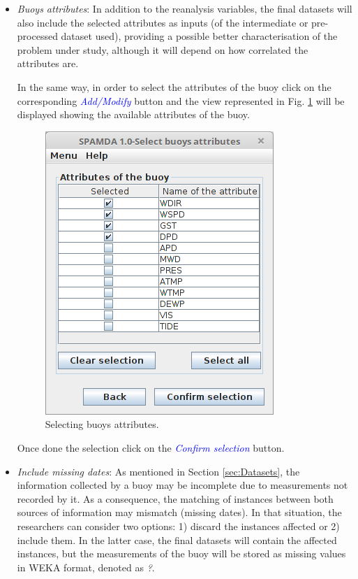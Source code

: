 \begin{onehalfspace}
\begin{itemize}
					\item \textit{Buoys attributes}: In addition to the reanalysis variables, the final datasets will also include the selected attributes as inputs (of the intermediate or pre-processed dataset used), providing a possible better characterisation of the problem under study, although it will depend on how correlated the attributes are.
					
					In the same way, in order to select the attributes of the buoy click on the corresponding \textcolor{blue}{\textit{Add/Modify}} button and the view represented in Fig. \ref{fig:selectingBuoysAttributes} will be displayed showing the available attributes of the buoy.
					
					\begin{figure}[ht!]
						\centering
						\includegraphics[scale=0.40]{figures/selectingBuoysAttributes.png}
						\caption{Selecting buoys attributes.}
						\label{fig:selectingBuoysAttributes}
					\end{figure}
					
					Once done the selection click on the \textcolor{blue}{\textit{Confirm selection}} button.
					
					\item \textit{Include missing dates}: As mentioned in Section \ref{sec:Datasets}, the information collected by a buoy may be incomplete due to measurements not recorded by it. As a consequence, the matching of instances between both sources of information may mismatch (missing dates). In that situation, the researchers can consider two options: 1) discard the instances affected or 2) include them. In the latter case, the final datasets will contain the affected instances, but the measurements of the buoy will be stored as missing values in WEKA format, denoted as \guillemotleft\textit{?}\guillemotright.
					

\end{itemize}
\end{onehalfspace}
